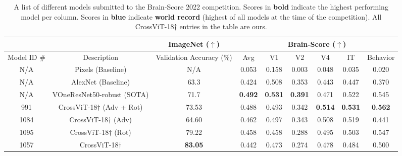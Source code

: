 \documentclass{article} %
\newcommand{\BlueM}{\textcolor{BlueModel}}
\newcommand{\GreenM}{\textcolor{GreenModel}}
\newcommand{\PinkM}{\textcolor{PinkModel}}
\newcommand{\OrangeM}{\textcolor{OrangeModel}}
\newcommand{\record}{\textcolor{BlueModel2}}
\begin{document}
\begin{table}[t!]
\footnotesize
\centering
\begin{adjustbox}{width=\textwidth}

\begin{tabular}{|c|c|c|c|c|c|c|c|c|} 
\hline
\multicolumn{2}{|c|}{} & ImageNet ($\uparrow$) & \multicolumn{6}{|c|}{Brain-Score ($\uparrow$)} \\
 \hline
 Model ID \# & Description & Validation Accuracy (\%) & Avg & V1 & V2 & V4 & IT & Behavior \\
 \hline
 N/A & Pixels (Baseline) & N/A & 0.053 & 0.158 & 0.003 & 0.048 & 0.035 & 0.020 \\
 N/A & AlexNet (Baseline) & 63.3 & 0.424 & 0.508 & 0.353 & 0.443 & 0.447 & 0.370 \\
 N/A & VOneResNet50-robust (SOTA) & 71.7 & \textbf{0.492} & \textbf{0.531} & \textbf{0.391} & 0.471 & 0.522 & 0.545\\
 \hline
991 & \BlueM{CrossViT-18$\dagger$ (Adv + Rot)} & 73.53 & 0.488 & 0.493 & 0.342 & \textbf{\record{0.514}} & \textbf{0.531} & \textbf{0.562}\\  
1084 & \GreenM{CrossViT-18$\dagger$ (Adv)} & 64.60 & 0.462  & 0.497 & 0.343 & 0.508 & 0.519 & 0.441 \\ 
 1095   & \PinkM{CrossViT-18$\dagger$ (Rot)} & 79.22 & 0.458 & 0.458 & 0.288 & 0.495 & 0.503 &0.547 \\ 
 1057 & \OrangeM{CrossViT-18$\dagger$} & \textbf{83.05} & 0.442 & 0.473 & 0.274 & 0.478 & 0.484 & 0.500\\ 
\hline
\end{tabular}
 \end{adjustbox}

\caption{A list of different models submitted to the Brain-Score 2022 competition. Scores in \textbf{bold} indicate the highest performing model per column. Scores in \textbf{\record{blue}} indicate \textbf{\record{world record}} (highest of all models at the time of the competition). All CrossViT-18$\dagger$ entries in the table are ours.}
\label{table:2}
\end{table}
\end{document}

